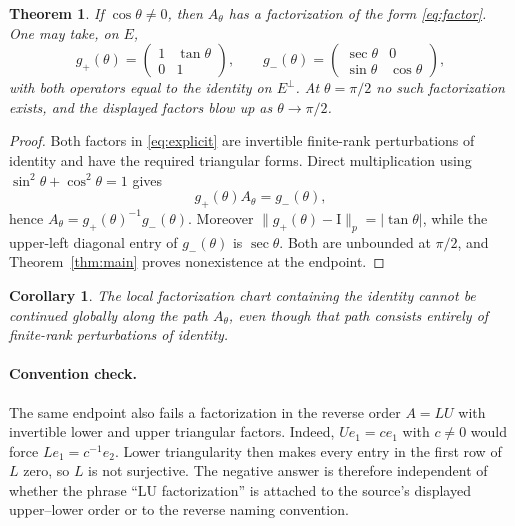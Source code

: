 \documentclass[11pt]{article}
\newtheorem{theorem}{Theorem}
\newtheorem{corollary}{Corollary}
\newcommand{\Id}{\mathrm I}
\begin{document}
\begin{theorem}\label{thm:path}
If \(\cos\theta\neq0\), then \(A_\theta\) has a factorization of the form
\eqref{eq:factor}.  One may take, on \(E\),
\begin{equation}\label{eq:explicit}
 g_+(\theta)=\begin{pmatrix}1&\tan\theta\\0&1\end{pmatrix},
 \qquad
 g_-(\theta)=\begin{pmatrix}\sec\theta&0\\
 \sin\theta&\cos\theta\end{pmatrix},
\end{equation}
with both operators equal to the identity on \(E^\perp\).  At
\(\theta=\pi/2\) no such factorization exists, and the displayed factors
blow up as \(\theta\to\pi/2\).
\end{theorem}

\begin{proof}
Both factors in \eqref{eq:explicit} are invertible finite-rank perturbations
of identity and have the required triangular forms.  Direct multiplication
using \(\sin^2\theta+\cos^2\theta=1\) gives
\[
 g_+(\theta)A_\theta=g_-(\theta),
\]
hence \(A_\theta=g_+(\theta)^{-1}g_-(\theta)\).  Moreover
\(\|g_+(\theta)-\Id\|_p=|\tan\theta|\), while the upper-left diagonal entry
of \(g_-(\theta)\) is \(\sec\theta\).  Both are unbounded at \(\pi/2\), and
Theorem~\ref{thm:main} proves nonexistence at the endpoint.
\end{proof}

\begin{corollary}
The local factorization chart containing the identity cannot be continued
globally along the path \(A_\theta\), even though that path consists entirely
of finite-rank perturbations of identity.
\end{corollary}

\paragraph{Convention check.}
The same endpoint also fails a factorization in the reverse order
\(A=LU\) with invertible lower and upper triangular factors.  Indeed,
\(Ue_1=c e_1\) with \(c\neq0\) would force \(Le_1=c^{-1}e_2\).  Lower
triangularity then makes every entry in the first row of \(L\) zero, so
\(L\) is not surjective.  The negative answer is therefore independent of
whether the phrase ``LU factorization'' is attached to the source's displayed
upper--lower order or to the reverse naming convention.
\end{document}
